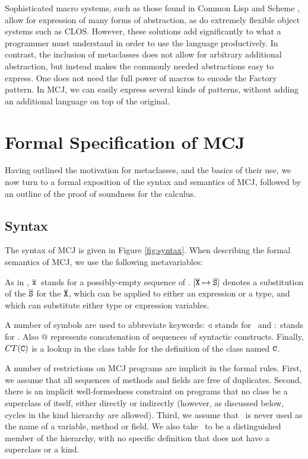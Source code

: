 \documentclass[10pt]{acm-sigplan}
\begin{document}
Sophisticated macro systems, such as those found in Common Lisp
\cite{steele-90} and Scheme \cite{SyntaxCase}, allow for expression of
many forms of abstraction, as do extremely flexible object systems
such as CLOS. However, these solutions add significantly to what a
programmer must understand in order to use the language productively.
In contrast, the inclusion of metaclasses does not allow for arbitrary
additional abstraction, but instead makes the commonly needed
abstractions easy to express.  One does not need the full power of
macros to encode the Factory pattern.  In MCJ, we can easily express
several kinds of patterns, without adding an additional language on
top of the original.


\section{Formal Specification of MCJ}

\label{formal}

Having outlined the motivation for metaclasses, and the basics of
their use, we now turn to a formal exposition of the syntax and
semantics of MCJ, followed by an outline of the proof of soundness for
the calculus.


\subsection{Syntax}
\label{Syntax}

\figSyntax

The syntax of MCJ is given in Figure \ref{fig:syntax}. When describing
the formal semantics of MCJ, we use the following metavariables:

\metavars

As in \FJ, ${\overline{{\mbox {\tt x}}}}$\ stands for a possibly-empty
sequence of \x.  $[{\overline {\mbox {\tt X}}} \mapsto {\overline {\mbox {\tt S}}}]$ denotes a substitution of the ${\overline{{\mbox {\tt S}}}}$ for the
${\overline{{\mbox {\tt X}}}}$, which can be applied to either an expression or a type, and
which can substitute either type or expression variables.

A number of symbols are used to abbreviate keywords: $\triangleleft$
stands for \extends\ and $:$ stands for \kind. Also
$@$ represents concatenation of sequences of syntactic constructs.
Finally, $CT(\mathtt{{C}})$ is a lookup in the class table for the definition of
the class named $\mathtt{{C}}$.

A number of restrictions on MCJ programs are implicit in the formal
rules.  First, we assume that all sequences of methods and fields are
free of duplicates.  Second, there is an implicit well-formedness
constraint on programs that no class be a superclass of itself, either
directly or indirectly (however, as discussed below, cycles in the
kind hierarchy are allowed).  Third, we assume that \this\ is
never used as the name of a variable, method or field.  We also take
\Object\ to be a distinguished member of the hierarchy, with no
specific definition that does not have a superclass or a kind.
\end{document}
